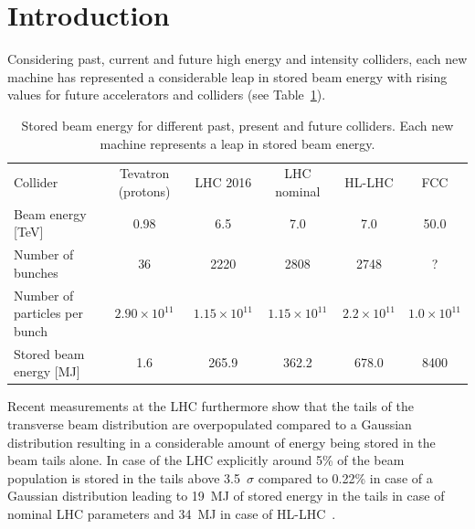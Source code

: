 \documentclass[%
 reprint,
 amsmath,amssymb,
 aps,
prstab,
]{revtex4-1}
\begin{document}

\section{Introduction\label{sec:intro}}%
Considering past, current and future high energy and intensity colliders, each new machine has represented a considerable leap in stored beam energy with rising values for future accelerators and colliders (see Table~\ref{tab:stored_energy}). 
\begin{table}
	\caption{\label{tab:stored_energy}%
		Stored beam energy for different past, present and future colliders. Each new machine represents a leap in stored beam energy.
	}
	\begin{ruledtabular}
		\begin{tabular}{lccccc}
			Collider& Tevatron (protons) \cite{tevatron} & LHC 2016 \cite{chamonix2017param}
			& LHC nominal \cite{lhc_design} & HL-LHC \cite{hlcdr} & FCC \cite{fcc_param_2017} \\
			\colrule
			Beam energy [TeV] & 0.98 & 6.5 & 7.0 & 7.0 & 50.0\\
			Number of bunches & 36 & 2220 & 2808 & 2748 & ? \\
			Number of particles per bunch & $2.90\times 10^{11}$ & $1.15\times 10^{11}$ & $1.15\times 10^{11}$ & $2.2\times 10^{11}$ & $1.0\times 10^{11}$\\
			Stored beam energy [MJ] & 1.6 & 265.9 & 362.2 & 678.0 & 8400 \\
		\end{tabular}
	\end{ruledtabular}
\end{table}
Recent measurements at the LHC furthermore show that the tails of the transverse beam distribution are overpopulated compared to a Gaussian distribution resulting in a considerable amount of energy being stored in the beam tails alone. In case of the LHC explicitly around 5\% of the beam population is stored in the tails above 3.5~$\sigma$ compared to 0.22\% in case of a Gaussian distribution leading to 19~MJ of stored energy in the tails in case of nominal LHC parameters and 34~MJ in case of HL-LHC~\cite{helreview_valentino}.
\end{document}
